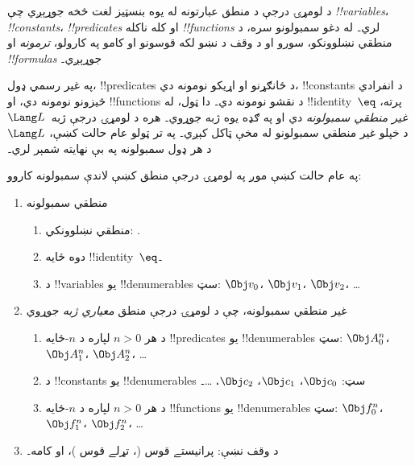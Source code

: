 \documentclass[../../../include/open-logic-section]{subfiles}
\begin{document}



د لومړۍ درجې د منطق عبارتونه له يوه بنسټيز لغت څخه جوړېږي چې
\emph{!!{variable}s}، \emph{!!{constant}s}، \emph{!!{predicate}s}
او کله ناکله \emph{!!{function}s} لري۔ له دغو سمبولونو سره، د منطقي
نښلوونکو، سورو او د وقف د نښو لکه قوسونو او کامو په کارولو،
\emph{ترمونه} او \emph{!!{formula}s} جوړېږي۔

\begin{explain}
په غير رسمي ډول، !!{predicate}s د ځانګړنو او اړيکو نومونه دي،
!!{constant}s د انفرادي څيزونو نومونه دي، او !!{function}s د نقشو
نومونه دي۔ دا ټول، له !!{identity}~$\eq$ پرته، \emph{غير منطقي
سمبولونه} دي او په ګډه يوه ژبه جوړوي۔ هره د لومړۍ درجې ژبه~$\Lang L$
د خپلو غير منطقي سمبولونو له مخې ټاکل کېږي۔ په تر ټولو عام حالت کښې،
$\Lang L$ د هر ډول سمبولونه په بې نهايته شمېر لري۔
\end{explain}

په عام حالت کښې موږ په لومړۍ درجې منطق کښې لاندې سمبولونه کاروو:

\begin{enumerate}
\item منطقي سمبولونه
\begin{enumerate}
\item منطقي نښلوونکي:
  \startycommalist
  .
\item دوه ځايه !!{identity}~$\eq$۔
\item د !!{variable}s يو !!{denumerable}s سټ: $\Obj v_0$، $\Obj v_1$، $\Obj
  v_2$، \dots
\end{enumerate}
\item غير منطقي سمبولونه، چې د لومړۍ درجې منطق \emph{معياري
  ژبه} جوړوي
\begin{enumerate}
\item د هر $n>0$ لپاره د $n$-ځايه !!{predicate}s يو !!{denumerable}s سټ: $\Obj
  A^n_0$، $\Obj A^n_1$، $\Obj A^n_2$، \dots
\item د !!{constant}s يو !!{denumerable}s سټ: $\Obj c_0$، $\Obj c_1$، $\Obj
  c_2$، \dots۔
\item د هر $n>0$ لپاره د $n$-ځايه !!{function}s يو !!{denumerable}s سټ:
  $\Obj f^n_0$، $\Obj f^n_1$، $\Obj f^n_2$، \dots
\end{enumerate}
\item د وقف نښې: پرانيستے قوس (، تړلے قوس )، او کامه۔
\end{enumerate}
\end{document}
